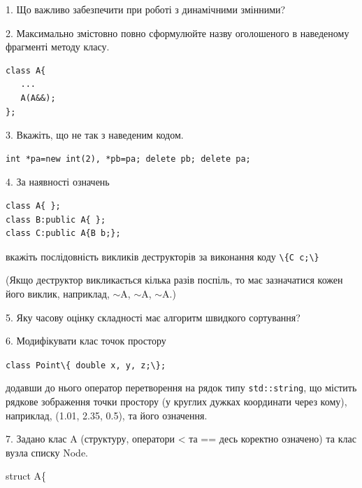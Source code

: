 \documentclass[12pt, ukrainian]{article}
\def\code#1{\Verb!#1!}
\begin{document}
{%
1. Що важливо забезпечити при роботі з динамічними змінними?%
\par
\vspace{2mm}
2. Максимально змістовно повно сформулюйте назву оголошеного в наведеному фрагменті методу класу.
\vspace{-3mm}
\begin{verbatim}class A{
   ...
   A(A&&);
};\end{verbatim}
\vspace{-3mm}
\par
\vspace{2mm}
3. Вкажіть, що не так з наведеним кодом.
\vspace{-3mm}
\begin{verbatim}int *pa=new int(2), *pb=pa; delete pb; delete pa;\end{verbatim}
\vspace{-3mm}
\par
\vspace{2mm}
4. За наявності означень
\vspace{-3mm}
\begin{verbatim}
class A{ };
class B:public A{ };
class C:public A{B b;};\end{verbatim}
\vspace{-3mm}
вкажіть послідовність викликів деструкторів за виконання коду \code{\{C c;\}} 

(Якщо деструктор викликається кілька разів поспіль, то має зазначатися кожен його виклик, наприклад, $\sim$A, $\sim$A, $\sim$A.)

\vspace{2mm}
5. Яку часову оцінку складності має алгоритм швидкого сортування?
\par
\vspace{2mm}
6. Модифікувати клас точок простору 

\qquad\code{class Point\{ double x, y, z;\};}


додавши до нього оператор перетворення на рядок типу \code{std::string}, що містить рядкове зображення точки простору (у круглих дужках координати через кому), наприклад, (1.01, 2.35, 0.5), та його означення.%
\par
\vspace{2mm}
7. 
Задано клас A (структуру, оператори < та == десь коректно означено) та клас вузла списку Node.

struct A\{

}
\end{document}
